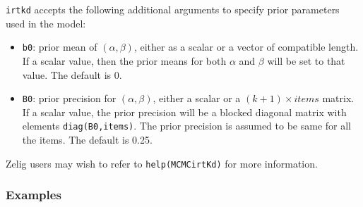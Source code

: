 \noindent \texttt{irtkd} accepts the following additional arguments to 
specify prior parameters used in the model:

\begin{itemize}

\item \texttt{b0}: prior mean of $(\alpha, \beta)$, either as a scalar or
a vector of compatible length. If a scalar value, then the prior means
for both $\alpha$ and $\beta$ will be set to that value. The default
is 0.

\item \texttt{B0}: prior precision for $(\alpha, \beta)$, either a
scalar or a $(k+1) \times items$ matrix. If a scalar value, the prior
precision will be a blocked diagonal matrix with elements
\texttt{diag(B0,items)}. The prior precision is assumed to be same for
all the items. The default is 0.25.

\end{itemize}

Zelig users may wish to refer to \texttt{help(MCMCirtKd)} for more 
information.



\subsubsection{Examples}

